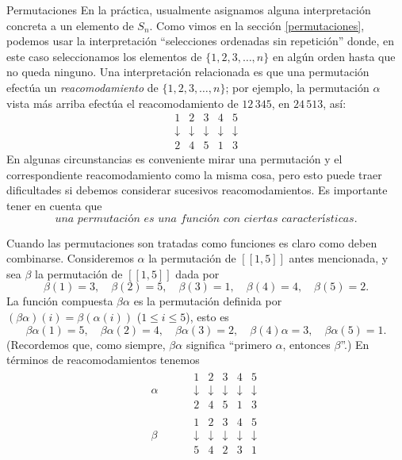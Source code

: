 \begin{section}{Permutaciones}
En la práctica, usualmente asignamos alguna interpretación concreta a un elemento de $S_n$. Como vimos en la sección \ref{permutaciones}, podemos usar la interpretación ``selecciones ordenadas sin repetición''   donde, en este caso seleccionamos los elementos de $\{1,2,3,\ldots,n\}$ en algún orden hasta que no queda ninguno. Una interpretación relacionada es que una permutación efectúa un \textit{reacomodamiento} de $\{1,2,3,\ldots,n\}$; por ejemplo, la permutación $\alpha$ vista más arriba  efectúa el reacomodamiento de $12\,345$, en $24\,513$, así:
$$
\begin{matrix} 1&2&3&4&5 \\
\downarrow&\downarrow&\downarrow&\downarrow&\downarrow\\2 &4 &5 &1
& 3
\end{matrix}
$$
En algunas circunstancias es conveniente mirar una permutación y el correspondiente reacomodamiento como la misma cosa, pero esto puede traer dificultades si debemos considerar sucesivos reacomodamientos. Es importante tener en cuenta que 
$$
\textit{una permutación es una función con ciertas características.}
$$

Cuando las permutaciones son tratadas como funciones es claro como deben combinarse. Consideremos $\alpha$ la permutación de $[[1,5]]$ antes mencionada, y sea $\beta$ la permutación de $[[1,5]]$ dada por 
$$
\beta(1)=3,\quad \beta(2)=5,\quad \beta(3)=1,\quad
\beta(4)=4,\quad \beta(5)=2.
$$
La función compuesta $\beta\alpha$ es la permutación definida por $(\beta\alpha)(i)= \beta(\alpha(i))$ ($1\le i\le 5$), esto es 
$$
\beta\alpha(1)=5,\quad \beta\alpha(2)=4,\quad
\beta\alpha(3)=2,\quad \beta(4)\alpha=3,\quad \beta\alpha(5)=1.
$$
(Recordemos que, como siempre, $\beta\alpha$ significa ``primero $\alpha$, entonces $\beta$''.) En términos de reacomodamientos tenemos
$$\begin{aligned}
\alpha\quad&\quad\begin{matrix} 1&2&3&4&5 \\
\downarrow&\downarrow&\downarrow&\downarrow&\downarrow\\2 &4 &5 &1
& 3
\end{matrix} \\
\beta \quad&\quad \begin{matrix} 1&2&3&4&5 \\
\downarrow&\downarrow&\downarrow&\downarrow&\downarrow\\5 &4 &2 &3
& 1
\end{matrix}
 \end{aligned}
$$




\end{section}
